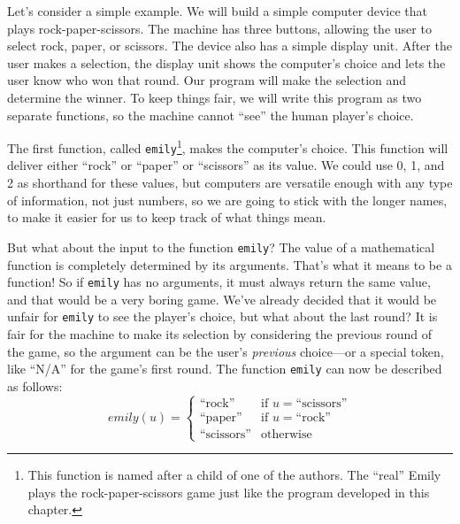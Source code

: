 Let's consider a simple example.  We will build a
simple computer device that plays rock-paper-scissors.  The machine
has three buttons, allowing the user to select rock, paper, or
scissors.  The device also has a simple display unit.  After the user
makes a selection, the display unit shows the computer's choice and
lets the user know who won that round.  Our program will make the
selection and determine the winner.  To keep things fair, we will
write this program as two separate functions, so the machine cannot
``see'' the human player's choice.

The first function, called \texttt{emily}\footnote{This function is
named after a child of one of the authors.  The ``real'' Emily
plays the rock-paper-scissors game just like the program developed in this
chapter.}, makes the computer's choice.  This function will deliver
either ``rock'' or ``paper'' or ``scissors'' as its value.
We could use 0, 1, and 2 as shorthand for these values,
but computers are versatile enough
with any type of information, not just numbers, so we are going to stick with the longer names, to make it easier for us to keep track of what things mean.

But what about the input to the function \texttt{emily}?  The value of a mathematical function is completely determined by
its arguments.  That's what it means to be a function! So if
\texttt{emily} has no arguments, it must always return the same value,
and that would be a very boring game.  We've already decided that it
would be unfair for \texttt{emily} to see the player's choice,
but what about the last round?  It is fair for the machine to make its selection by considering the previous round of the game, so the argument can be the user's
\emph{previous} choice---or a special token, like ``N/A'' for the
game's first round.  The function \texttt{emily} can now be described
as follows:
\begin{displaymath}
emily(u) =
   \left\{
        \begin{array}{ll}
        \mbox{``rock''}     & \mbox{if } u = \mbox{``scissors''} \\
        \mbox{``paper''}    & \mbox{if } u = \mbox{``rock''} \\
        \mbox{``scissors''} & \mbox{otherwise}
        \end{array}
   \right.
\end{displaymath}


